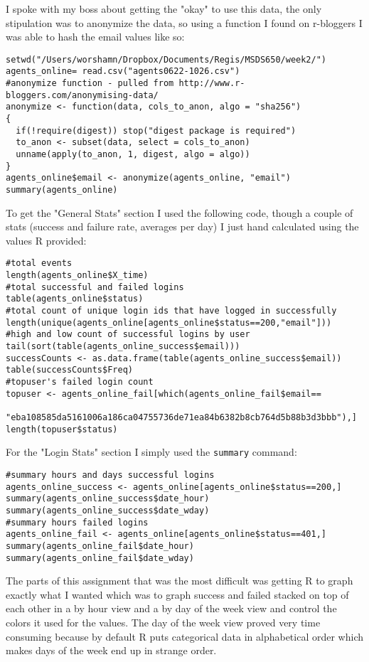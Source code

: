 \documentclass[10pt]{article}
\begin{document}
I spoke with my boss about getting the "okay" to use this data, the only stipulation was to anonymize the data, so using a function I found on r-bloggers I was able to hash the email values like so:
\begin{verbatim}
setwd("/Users/worshamn/Dropbox/Documents/Regis/MSDS650/week2/")
agents_online= read.csv("agents0622-1026.csv")
#anonymize function - pulled from http://www.r-bloggers.com/anonymising-data/
anonymize <- function(data, cols_to_anon, algo = "sha256")
{
  if(!require(digest)) stop("digest package is required")
  to_anon <- subset(data, select = cols_to_anon)
  unname(apply(to_anon, 1, digest, algo = algo))
}
agents_online$email <- anonymize(agents_online, "email")
summary(agents_online)
\end{verbatim}
To get the "General Stats" section I used the following code, though a couple of stats (success and failure rate, averages per day) I just hand calculated using the values R provided:
\begin{verbatim}
#total events
length(agents_online$X_time)
#total successful and failed logins
table(agents_online$status)
#total count of unique login ids that have logged in successfully
length(unique(agents_online[agents_online$status==200,"email"]))
#high and low count of successful logins by user
tail(sort(table(agents_online_success$email)))
successCounts <- as.data.frame(table(agents_online_success$email))
table(successCounts$Freq)
#topuser's failed login count
topuser <- agents_online_fail[which(agents_online_fail$email==
  "eba108585da5161006a186ca04755736de71ea84b6382b8cb764d5b88b3d3bbb"),]
length(topuser$status)
\end{verbatim}
For the "Login Stats" section I simply used the \verb|summary| command:
\begin{verbatim}
#summary hours and days successful logins
agents_online_success <- agents_online[agents_online$status==200,]
summary(agents_online_success$date_hour)
summary(agents_online_success$date_wday)
#summary hours failed logins
agents_online_fail <- agents_online[agents_online$status==401,]
summary(agents_online_fail$date_hour)
summary(agents_online_fail$date_wday)
\end{verbatim}
The parts of this assignment that was the most difficult was getting R to graph exactly what I wanted which was to graph success and failed stacked on top of each other in a by hour view and a by day of the week view and control the colors it used for the values. The day of the week view proved very time consuming because by default R puts categorical data in alphabetical order which makes days of the week end up in strange order. 
\end{document}
